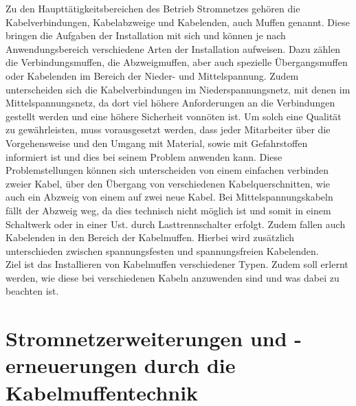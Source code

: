 Zu den Haupttätigkeitsbereichen des Betrieb Stromnetzes gehören die Kabelverbindungen, Kabelabzweige und Kabelenden, auch Muffen genannt. Diese bringen die 
Aufgaben der Installation mit sich und können je nach Anwendungsbereich verschiedene Arten der Installation aufweisen. Dazu zählen \zB die Verbindungsmuffen, 
die Abzweigmuffen, aber auch spezielle Übergangsmuffen oder Kabelenden im Bereich der Nieder- und Mittelspannung. Zudem unterscheiden sich die 
Kabelverbindungen im Niederspannungsnetz, mit denen im Mittelspannungsnetz, da dort viel höhere Anforderungen an die Verbindungen gestellt werden und eine 
höhere Sicherheit vonnöten ist. Um solch eine Qualität zu gewährleisten, muss vorausgesetzt werden, dass jeder Mitarbeiter über die Vorgehensweise und den 
Umgang mit Material, sowie mit Gefahrstoffen informiert ist und dies bei seinem Problem anwenden kann. Diese Problemstellungen können sich unterscheiden von 
einem einfachen verbinden zweier Kabel, über den Übergang von verschiedenen Kabelquerschnitten, wie auch ein Abzweig von einem auf zwei neue Kabel. Bei 
Mittelspannungskabeln fällt der Abzweig weg, da dies technisch nicht möglich ist und somit in einem Schaltwerk oder in einer Ust. durch Lasttrennschalter 
erfolgt. Zudem fallen auch Kabelenden in den Bereich der Kabelmuffen. Hierbei wird zusätzlich unterschieden zwischen spannungsfesten und spannungsfreien 
Kabelenden. 
\\
Ziel ist das Installieren von Kabelmuffen verschiedener Typen. Zudem soll erlernt werden, wie diese bei verschiedenen Kabeln anzuwenden sind und was dabei 
zu beachten ist.
\clearpage

\section{Stromnetzerweiterungen und -erneuerungen durch die Kabelmuffentechnik}

